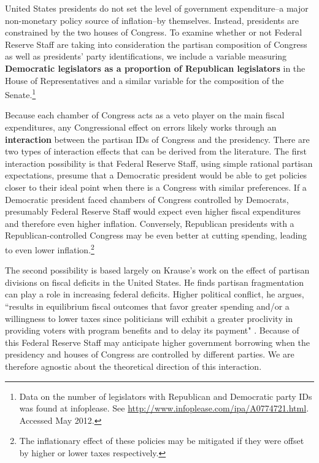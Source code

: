\documentclass[a4paper]{article}\usepackage{graphicx, color}
\begin{document}
United States presidents do not set the level of government expenditure--a major non-monetary policy source of inflation--by themselves. Instead, presidents are constrained by the two houses of Congress. To examine whether or not Federal Reserve Staff are taking into consideration the partisan composition of Congress as well as presidents' party identifications, we include a variable measuring {\bf{Democratic legislators as a proportion of Republican legislators}} in the House of Representatives and a similar variable for the composition of the Senate.\footnote{Data on the number of legislators with Republican and Democratic party IDs was found at infoplease. See {\url{http://www.infoplease.com/ipa/A0774721.html}}. Accessed May 2012.} 

Because each chamber of Congress acts as a veto player on the main fiscal expenditures, any Congressional effect on errors likely works through an \textbf{interaction} between the partisan IDs of Congress and the presidency. There are two types of interaction effects that can be derived from the literature. The first interaction possibility is that Federal Reserve Staff, using simple rational partisan expectations, presume that a Democratic president would be able to get policies closer to their ideal point when there is a Congress with similar preferences. If a Democratic president faced chambers of Congress controlled by Democrats, presumably Federal Reserve Staff would expect even higher fiscal expenditures and therefore even higher inflation. Conversely, Republican presidents with a Republican-controlled Congress may be even better at cutting spending, leading to even lower inflation.\footnote{The inflationary effect of these policies may be mitigated if they were offset by higher or lower taxes respectively.}

The second possibility is based largely on Krause's \citeyearpar{Krause2000} work on the effect of partisan divisions on fiscal deficits in the United States. He finds partisan fragmentation can play a role in increasing federal deficits. Higher political conflict, he argues, ``results in equilibrium fiscal outcomes that favor greater spending and/or a willingness to lower taxes since politicians will exhibit a greater proclivity in providing voters with program benefits and to delay its payment" \citep[][542]{Krause2000}. Because of this Federal Reserve Staff may anticipate higher government borrowing when the presidency and houses of Congress are controlled by different parties. We are therefore agnostic about the theoretical direction of this interaction.
\end{document}
